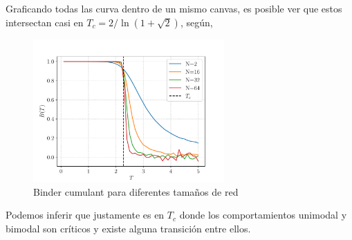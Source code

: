 \documentclass[11pt,a4paper]{article}
\begin{document}
Graficando todas las curva dentro de un mismo canvas, es posible ver que estos intersectan casi en $T_c = 2/\ln{(1+\sqrt{2})}$, según,
\begin{figure}[H]
    \centering
    \includegraphics[width=0.65\textwidth]{p4/all_binder.pdf}
    \caption{Binder cumulant para diferentes tamaños de red}
    \label{fig:p4_9}
\end{figure}
Podemos inferir que justamente es en $T_c$ donde los comportamientos unimodal y bimodal son críticos y existe alguna transición entre ellos. 



\end{document}
